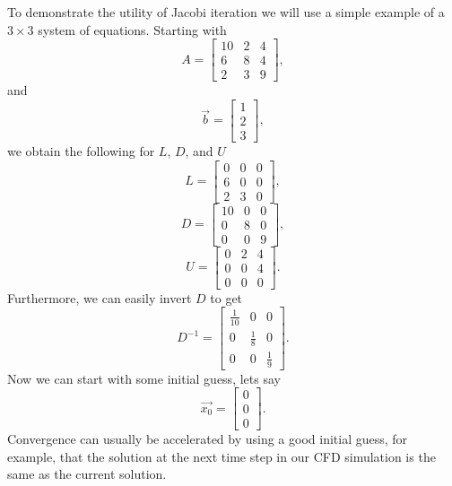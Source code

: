 To demonstrate the utility of Jacobi iteration we will use a simple example of a $3 \times 3$ system of equations. Starting with 
\begin{equation}
	A = 
	\begin{bmatrix}
	    10 & 2 & 4 \\
	    6 & 8 & 4 \\
			2 & 3 & 9
	\end{bmatrix},
\end{equation}
and
\begin{equation}
	\vec{b} = \begin{bmatrix}
	    1 \\
	    2 \\
			3
	\end{bmatrix},
\end{equation}
we obtain the following for $L$, $D$, and $U$
\begin{equation}
	L = 
	\begin{bmatrix}
	    0 & 0 & 0 \\
	    6 & 0 & 0 \\
			2 & 3 & 0
	\end{bmatrix},
\end{equation}
\begin{equation}
	D = 
	\begin{bmatrix}
	    10 & 0 & 0 \\
	    0 & 8 & 0 \\
			0 & 0 & 9
	\end{bmatrix},
\end{equation}
\begin{equation}
	U = 
	\begin{bmatrix}
	    0 & 2 & 4 \\
	    0 & 0 & 4 \\
			0 & 0 & 0
	\end{bmatrix}.
\end{equation}
Furthermore, we can easily invert $D$ to get
\begin{equation}
	D^{-1} = 
	\begin{bmatrix}
	    \frac{1}{10} & 0 & 0 \\
	    0 & \frac{1}{8} & 0 \\
			0 & 0 & \frac{1}{9}
	\end{bmatrix}.
\end{equation}
Now we can start with some initial guess, lets say
\begin{equation}
	\vec{x_0} = \begin{bmatrix}
	    0 \\
	    0 \\
			0
	\end{bmatrix}.
\end{equation}
Convergence can usually be accelerated by using a good initial guess, for example, that the solution at the next time step in our CFD simulation is the same as the current solution.


